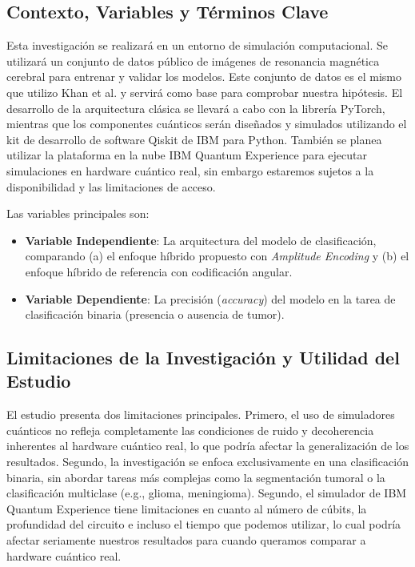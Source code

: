 \subsection*{Contexto, Variables y Términos Clave}

\justify
Esta investigación se realizará en un entorno de simulación computacional. Se utilizará un conjunto de datos público de imágenes de resonancia magnética cerebral \cite{cheng2017brain} para entrenar y validar los modelos. Este conjunto de datos es el mismo que utilizo Khan et al. \cite{khan2024brain} y servirá como base para comprobar nuestra hipótesis. El desarrollo de la arquitectura clásica se llevará a cabo con la librería PyTorch, mientras que los componentes cuánticos serán diseñados y simulados utilizando el kit de desarrollo de software Qiskit de IBM para Python. También se planea utilizar la plataforma en la nube IBM Quantum Experience para ejecutar simulaciones en hardware cuántico real, sin embargo estaremos sujetos a la disponibilidad y las limitaciones de acceso.

Las variables principales son:
\begin{itemize}
    \item \textbf{Variable Independiente}: La arquitectura del modelo de clasificación, comparando (a) el enfoque híbrido propuesto con \textit{Amplitude Encoding} y (b) el enfoque híbrido de referencia con codificación angular.
    \item \textbf{Variable Dependiente}: La precisión (\textit{accuracy}) del modelo en la tarea de clasificación binaria (presencia o ausencia de tumor).
\end{itemize}

\subsection*{Limitaciones de la Investigación y Utilidad del Estudio}

\justify
El estudio presenta dos limitaciones principales. Primero, el uso de simuladores cuánticos no refleja completamente las condiciones de ruido y decoherencia inherentes al hardware cuántico real, lo que podría afectar la generalización de los resultados. Segundo, la investigación se enfoca exclusivamente en una clasificación binaria, sin abordar tareas más complejas como la segmentación tumoral o la clasificación multiclase (e.g., glioma, meningioma). Segundo, el simulador de IBM Quantum Experience tiene limitaciones en cuanto al número de cúbits, la profundidad del circuito e incluso el tiempo que podemos utilizar, lo cual podría afectar seriamente nuestros resultados para cuando queramos comparar a hardware cuántico real.

